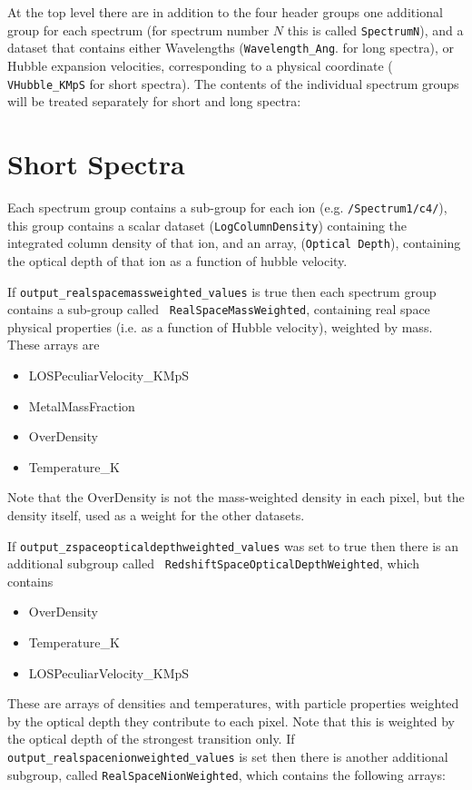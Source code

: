 \documentclass{report}
\begin{document}
At the top level there are in addition to the four header groups one
additional group for each spectrum (for spectrum number $N$ this is
called {\tt SpectrumN}), and a dataset that contains either
Wavelengths ({\tt Wavelength\_Ang}. for long spectra), or Hubble
expansion velocities, corresponding to a physical coordinate ({\tt
  VHubble\_KMpS} for short spectra).  The contents of the individual
spectrum groups will be treated separately for short and long spectra:

\section{Short Spectra}

Each spectrum group contains a sub-group for each ion
(e.g. {\tt /Spectrum1/c4/}), this group contains a scalar dataset
({\tt LogColumnDensity}) containing the integrated column density of
that ion, and an array, ({\tt Optical Depth}), containing the optical
depth of that ion as a function of hubble velocity.

If {\tt output\_realspacemassweighted\_values} is true then each
spectrum group contains a sub-group called {\tt
  RealSpaceMassWeighted}, containing real space physical properties
(i.e. as a function of Hubble velocity), weighted by mass.  These
arrays are

\begin{itemize}
\item LOSPeculiarVelocity\_KMpS
\item MetalMassFraction
\item OverDensity
\item Temperature\_K
\end{itemize}
Note that the OverDensity is not the mass-weighted density in each pixel, but the density itself, used as a weight for the other datasets. 

If {\tt output\_zspaceopticaldepthweighted\_values} was set to true
then there is an additional subgroup called {\tt
  RedshiftSpaceOpticalDepthWeighted}, which contains

\begin{itemize}
\item OverDensity
\item Temperature\_K
\item LOSPeculiarVelocity\_KMpS
\end{itemize}

These are arrays of densities and temperatures, with particle properties weighted by the optical depth they contribute to each pixel. Note that this is weighted by the optical depth of the strongest transition only. If {\tt output\_realspacenionweighted\_values} is set then there is another additional subgroup, called {\tt RealSpaceNionWeighted}, which contains the following arrays:
\end{document}
